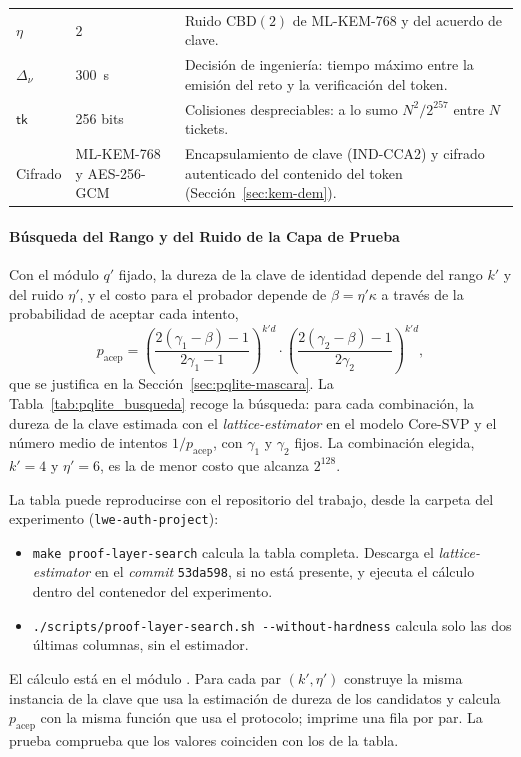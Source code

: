 \begin{table}[H]
\begin{tabularx}{\textwidth}{llY}
$\eta$ & $2$ & Ruido $\mathrm{CBD}(2)$ de ML-KEM-768 y del acuerdo de clave. \\
$\Delta_\nu$ & $300$~s & Decisión de ingeniería: tiempo máximo entre la emisión del reto y la verificación del token. \\
$\mathsf{tk}$ & 256 bits & Colisiones despreciables: a lo sumo $N^2/2^{257}$ entre $N$ tickets. \\
Cifrado & ML-KEM-768 y AES-256-GCM & Encapsulamiento de clave (IND-CCA2) y cifrado autenticado del contenido del token (Sección~\ref{sec:kem-dem}). \\
\bottomrule
\end{tabularx}
\end{table}

\paragraph{Búsqueda del Rango y del Ruido de la Capa de Prueba}

Con el módulo $q'$ fijado, la dureza de la clave de identidad depende del rango $k'$ y del ruido $\eta'$, y el costo para el probador depende de $\beta = \eta'\kappa$ a través de la probabilidad de aceptar cada intento,
\begin{equation}
p_{\text{acep}} = \left(\frac{2(\gamma_1-\beta)-1}{2\gamma_1-1}\right)^{k'd} \cdot \left(\frac{2(\gamma_2-\beta)-1}{2\gamma_2}\right)^{k'd},
\label{eq:pqlite-aceptacion}
\end{equation}
que se justifica en la Sección~\ref{sec:pqlite-mascara}. La Tabla~\ref{tab:pqlite_busqueda} recoge la búsqueda: para cada combinación, la dureza de la clave estimada con el \textit{lattice-estimator} en el modelo Core-SVP y el número medio de intentos $1/p_{\text{acep}}$, con $\gamma_1$ y $\gamma_2$ fijos. La combinación elegida, $k' = 4$ y $\eta' = 6$, es la de menor costo que alcanza $2^{128}$.

La tabla puede reproducirse con el repositorio del trabajo, desde la carpeta del experimento (\texttt{lwe-auth-project}):
\begin{itemize}
    \item \texttt{make proof-layer-search} calcula la tabla completa. Descarga el \textit{lattice-estimator} en el \textit{commit} \texttt{53da598}, si no está presente, y ejecuta el cálculo dentro del contenedor del experimento.
    \item \texttt{./scripts/proof-layer-search.sh -{}-without-hardness} calcula solo las dos últimas columnas, sin el estimador.
\end{itemize}
El cálculo está en el módulo . Para cada par $(k', \eta')$ construye la misma instancia de la clave que usa la estimación de dureza de los candidatos y calcula $p_{\text{acep}}$ con la misma función que usa el protocolo; imprime una fila por par. La prueba  comprueba que los valores coinciden con los de la tabla.

